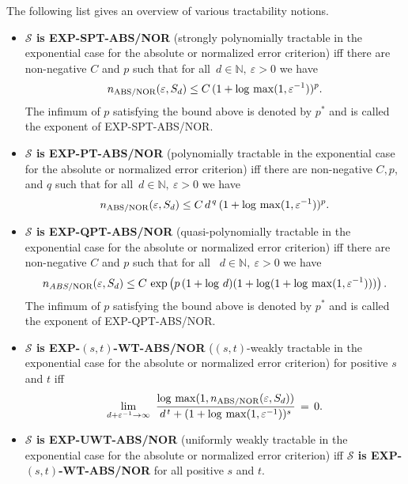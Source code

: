 \documentclass[graybox]{svmult}
\newcommand{\EXP}{\textup{EXP}\xspace}
\newcommand{\NOR}{\textup{NOR}\xspace}
\newcommand{\ABS}{\textup{ABS}\xspace}
\newcommand{\SPT}{\textup{SPT}\xspace}
\newcommand{\PT}{\textup{PT}\xspace}
\newcommand{\QPT}{\textup{QPT}\xspace}
\newcommand{\WT}{\textup{WT}\xspace}
\newcommand{\UWT}{\textup{UWT}\xspace}
\newcommand{\calS}{{\mathcal{S}}}
\newcommand{\N}{{\mathbb{N}}} %
\begin{document}
The following list gives an overview of various tractability notions. 
\begin{itemize}
\item   
{\bf{$\calS$ is \EXP-\SPT-\ABS/\NOR}} (strongly polynomially   
tractable in the exponential case for the absolute or normalized error   
criterion) iff there are non-negative $C$ and $p$ such that   
for all\ $d\in\N,\ \varepsilon>0$ we have    
$$   
n_{\ABS/\NOR}(\varepsilon,S_d)\le C\,(   
1+\log\,\max(1,\varepsilon^{-1}))^p.   
$$   
The infimum of $p$ satisfying the bound above is denoted by $p^*$   
and is called the exponent of \EXP-\SPT-\ABS/\NOR.    
\newline \qquad   
\item   
{\bf{$\calS$ is \EXP-\PT-\ABS/\NOR}} (polynomially   
tractable in the exponential case for the absolute or normalized error   
criterion) iff there are non-negative $C,p$, and $q$ such that   
for all\ $d\in\N,\ \varepsilon>0$ we have    
$$   
n_{\ABS/\NOR}(\varepsilon,S_d)\le C\,d^{\,q}\,   
(1+\log\,\max(1,\varepsilon^{-1}))^p.   
$$   
\vskip 0.5pc   
\item   
{\bf{$\calS$ is \EXP-\QPT-\ABS/\NOR}} (quasi-polynomially   
tractable in the exponential case for the absolute or normalized error   
criterion) iff there are non-negative $C$ and $p$ such that   
for all \ $d\in\N,\ \varepsilon>0$ we have    
$$   
n_{\\ABS/\NOR}(\varepsilon,S_d)\le   
C\,\exp\left(p\,(1+\log\,d)(1+\log(1+\log\,\max(1,\varepsilon^{-1})))\right).   
$$    
The infimum of $p$ satisfying the bound above is denoted by $p^*$   
and is called the exponent of \EXP-\QPT-\ABS/\NOR.    
\newline \qquad    
\item   
{\bf{$\calS$ is \EXP-$(s,t)$-\WT-\ABS/\NOR}} ($(s,t)$-weakly    
tractable in the exponential case for the absolute or normalized error   
criterion) for positive $s$ and $t$ iff    
$$   
\lim_{d+\varepsilon^{-1}\to\infty}\   
\frac{\log\,\max(1,n_{\ABS/\NOR}(\varepsilon,S_d))}{d^{\,t}+   
(1+\log\,\max(1,\varepsilon^{-1}))^{s}}\,=\,0.   
$$    
\vskip 0.5pc     
\item    
{\bf{$\calS$ is \EXP-\UWT-\ABS/\NOR}} (uniformly weakly tractable   
in the exponential case for the absolute or normalized error   
criterion) iff    
{\bf{$\calS$ is \EXP-$(s,t)$-\WT-\ABS/\NOR}} for all positive $s$ and $t$.   
\newline \qquad   
\end{itemize} 
\fi
\end{document}

